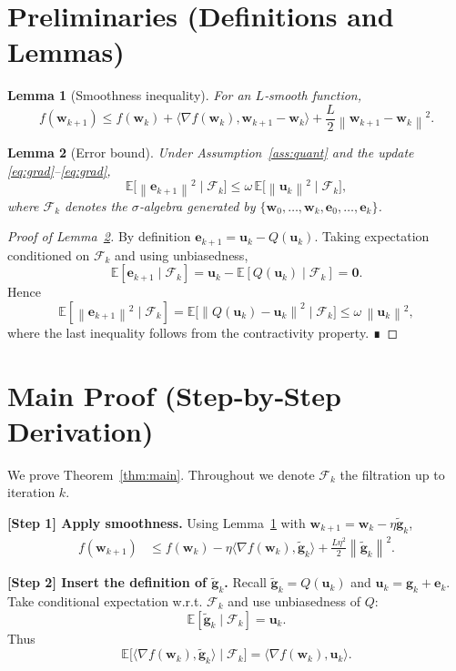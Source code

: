 \documentclass{article}
\newtheorem{lemma}{Lemma}
\newcommand{\E}{\mathbb{E}}
\newcommand{\norm}[1]{\left\lVert #1\right\rVert}
\begin{document}
\newpage
\section*{Preliminaries (Definitions and Lemmas)}
\begin{lemma}[Smoothness inequality]\label{lem:smooth}
For an $L$‑smooth function,
\[
f(\bm w_{k+1})\le f(\bm w_k)+\langle\nabla f(\bm w_k),\bm w_{k+1}-\bm w_k\rangle+\frac{L}{2}\norm{\bm w_{k+1}-\bm w_k}^2 .
\]
\end{lemma}
\begin{lemma}[Error bound]\label{lem:error-bound}
Under Assumption~\ref{ass:quant} and the update \eqref{eq:grad}–\eqref{eq:grad},
\[
\E\!\big[\norm{\bm e_{k+1}}^2\mid\mathcal F_k\big]\le\omega\,\E\!\big[\norm{\bm u_k}^2\mid\mathcal F_k\big] ,
\]
where $\mathcal F_k$ denotes the $\sigma$‑algebra generated by $\{\bm w_0,\dots,\bm w_k,\bm e_0,\dots,\bm e_k\}$.
\end{lemma}
\begin{proof}[Proof of Lemma~\ref{lem:error-bound}]
By definition $\bm e_{k+1}= \bm u_k-Q(\bm u_k)$. Taking expectation conditioned on $\mathcal F_k$ and using unbiasedness,
\[
\E[\bm e_{k+1}\mid\mathcal F_k]=\bm u_k-\E[Q(\bm u_k)\mid\mathcal F_k]=\bm 0 .
\]
Hence
\[
\E[\norm{\bm e_{k+1}}^2\mid\mathcal F_k]
= \E\big[\norm{Q(\bm u_k)-\bm u_k}^2\mid\mathcal F_k\big]
\le \omega\,\norm{\bm u_k}^2 ,
\]
where the last inequality follows from the contractivity property. ∎
\end{proof}

\section*{Main Proof (Step‑by‑Step Derivation)}
We prove Theorem~\ref{thm:main}. Throughout we denote $\mathcal F_k$ the filtration up to iteration $k$.

\noindent\textbf{[Step 1] Apply smoothness.}  
Using Lemma~\ref{lem:smooth} with $\bm w_{k+1}= \bm w_k-\eta\tilde{\bm g}_k$,
\begin{align}
f(\bm w_{k+1})
&\le f(\bm w_k)-\eta\langle\nabla f(\bm w_k),\tilde{\bm g}_k\rangle
+\frac{L\eta^{2}}{2}\norm{\tilde{\bm g}_k}^{2}. \tag{5}
\end{align}

\noindent\textbf{[Step 2] Insert the definition of $\tilde{\bm g}_k$.}  
Recall $\tilde{\bm g}_k=Q(\bm u_k)$ and $\bm u_k=\bm g_k+\bm e_k$.
Take conditional expectation w.r.t. $\mathcal F_k$ and use unbiasedness of $Q$:
\[
\E[\tilde{\bm g}_k\mid\mathcal F_k]=\bm u_k.
\]
Thus
\[
\E\big[\langle\nabla f(\bm w_k),\tilde{\bm g}_k\rangle\mid\mathcal F_k\big]
= \langle\nabla f(\bm w_k),\bm u_k\rangle . \tag{6}
\]
\end{document}
